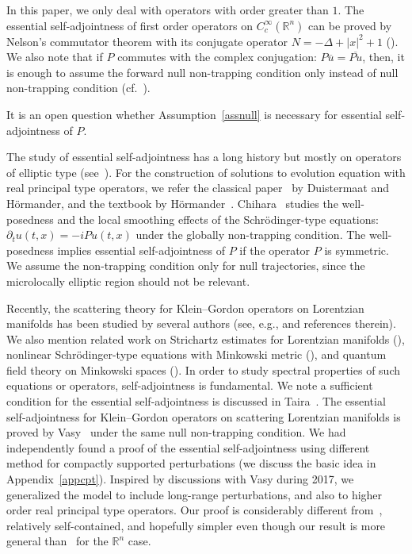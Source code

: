 \documentclass[AHL,Unicode,longabstracts,published]{cedram}
\newcommand*\re{\mathbb{R}}
\newcommand*\pa{\partial}
\begin{document}
\begin{rema}
In this paper, we only deal with operators with order greater than $1$. The essential self-adjointness of first order operators on $C_c^{\infty}(\re^n)$ can be proved by Nelson's commutator theorem with its conjugate operator $N=-\Delta+|x|^2+1$ (\cite[Theorem~X.36]{RS}). We also note that if $P$ commutes with the complex conjugation: $P\overline{u}=\overline{Pu}$, then, it is enough to assume the forward null non-trapping condition only instead of null non-trapping condition (cf.~\cite[Theorem~X.3]{RS}).
\end{rema}


\begin{rema}
It is an open question whether Assumption~\ref{assnull} is necessary for essential self-adjointness of $P$.
\end{rema}



The study of essential self-adjointness has a long history but mostly on operators of elliptic type (see~\cite[Chapter~X and reference therein]{RS}). For the construction of solutions to evolution equation with real principal type operators, we refer the classical paper~\cite{DH} by Duistermaat and H\"ormander, and the textbook by H\"ormander~\cite{Ho}. Chihara~\cite{C} studies the well-posedness and the local smoothing effects of the Schr\"odinger-type equations: $\pa_t u(t,x)=-iPu(t,x)$ under the globally non-trapping condition. The well-posedness implies essential self-adjointness of $P$ if the operator $P$ is symmetric. We assume the non-trapping condition only for null trajectories, since the microlocally elliptic region should not be relevant.

Recently, the scattering theory for Klein--Gordon operators on Lorentzian manifolds has been studied by several authors (see, e.g., \cite{BV,GNV,Va1} and references therein). We also mention related work on Strichartz estimates for Lorentzian manifolds (\cite{GT, MT, Taira}), nonlinear Schr\"odinger-type equations with Minkowski metric (\cite{GS, S, W}), and quantum field theory on Minkowski spaces (\cite{GW,VW}). In order to study spectral properties of such equations or operators, self-adjointness is fundamental. We note a sufficient condition for the essential self-adjointness is discussed in Taira~\cite{Taira}. The essential self-adjointness for Klein--Gordon operators on scattering Lorentzian manifolds is proved by Vasy~\cite{Va1} under the same null non-trapping condition. We had independently found a proof of the essential self-adjointness using different method for compactly supported perturbations (we discuss the basic idea in Appendix~\ref{appcpt}). Inspired by discussions with Vasy during 2017, we generalized the model to include long-range perturbations, and also to higher order real principal type operators. Our proof is considerably different from~\cite{Va1}, relatively self-contained, and hopefully simpler even though our result is more general than~\cite{Va1} for the $\re^n$ case.
\end{document}
